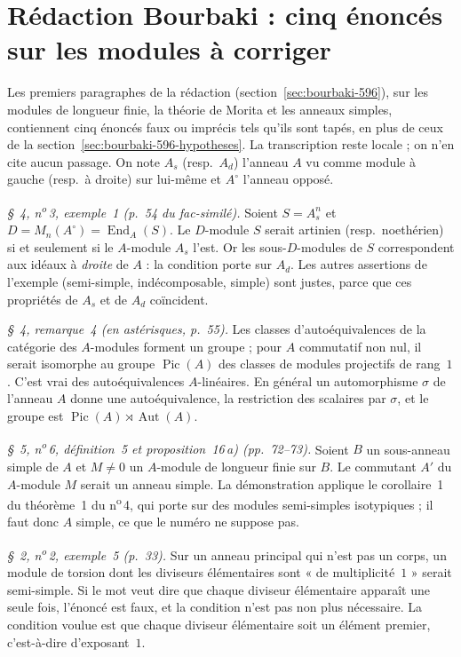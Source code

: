 \section[Rédaction Bourbaki \redac{596} : cinq énoncés sur les modules]{Rédaction Bourbaki  : cinq énoncés sur les modules à corriger\protect{}}\label{sec:bourbaki-596-modules}

Les premiers paragraphes de la rédaction  (section~\ref{sec:bourbaki-596}), sur les modules de longueur finie, la théorie de Morita et les anneaux simples, contiennent cinq énoncés faux ou imprécis tels qu'ils sont tapés, en plus de ceux de la section~\ref{sec:bourbaki-596-hypotheses}. La transcription reste locale ; on n'en cite aucun passage. On note $A_s$ (resp.\ $A_d$) l'anneau $A$ vu comme module à gauche (resp.\ à droite) sur lui-même et $A^{\circ}$ l'anneau opposé.

\emph{§~4, n\textsuperscript{o}\,3, exemple~1 (p.~54 du fac-similé).} Soient $S = A_s^n$ et $D = M_n(A^{\circ}) = \operatorname{End}_A(S)$. Le $D$-module $S$ serait artinien (resp.\ noethérien) si et seulement si le $A$-module $A_s$ l'est. Or les sous-$D$-modules de $S$ correspondent aux idéaux à \emph{droite} de $A$ : la condition porte sur $A_d$. Les autres assertions de l'exemple (semi-simple, indécomposable, simple) sont justes, parce que ces propriétés de $A_s$ et de $A_d$ coïncident.

\emph{§~4, remarque~4 (en astérisques, p.~55).} Les classes d'autoéquivalences de la catégorie des $A$-modules forment un groupe ; pour $A$ commutatif non nul, il serait isomorphe au groupe $\operatorname{Pic}(A)$ des classes de modules projectifs de rang~$1$. C'est vrai des autoéquivalences $A$-linéaires. En général un automorphisme $\sigma$ de l'anneau $A$ donne une autoéquivalence, la restriction des scalaires par $\sigma$, et le groupe est $\operatorname{Pic}(A) \rtimes \operatorname{Aut}(A)$.

\emph{§~5, n\textsuperscript{o}\,6, définition~5 et proposition~16\,a) (pp.~72--73).} Soient $B$ un sous-anneau simple de $A$ et $M \neq 0$ un $A$-module de longueur finie sur $B$. Le commutant $A'$ du $A$-module $M$ serait un anneau simple. La démonstration applique le corollaire~1 du théorème~1 du n\textsuperscript{o}\,4, qui porte sur des modules semi-simples isotypiques ; il faut donc $A$ simple, ce que le numéro ne suppose pas.

\emph{§~2, n\textsuperscript{o}\,2, exemple~5 (p.~33).} Sur un anneau principal qui n'est pas un corps, un module de torsion dont les diviseurs élémentaires sont « de multiplicité~$1$ » serait semi-simple. Si le mot veut dire que chaque diviseur élémentaire apparaît une seule fois, l'énoncé est faux, et la condition n'est pas non plus nécessaire. La condition voulue est que chaque diviseur élémentaire soit un élément premier, c'est-à-dire d'exposant~$1$.


